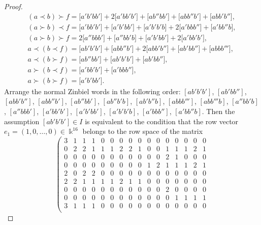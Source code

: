 \documentclass[pdftex]{sigma}
\numberwithin{equation}{section}
\begin{document}
\begin{proof}
\begin{gather*}
%
(a\prec b)\succ f
 = \bigl[a'b'bb'\bigr]+2\bigl[a'bb'b'\bigr] + \bigl[ab''bb'\bigr]+\bigl[abb''b'\bigr]+\bigl[abb'b''\bigr], \\
%
(a\succ b)\prec f
 = \bigl[a'bb'b'\bigr]+\bigl[a'b'bb'\bigr]+\bigl[a'b'b'b\bigr] + 2\bigl[a'bbb''\bigr]+\bigl[a'bb''b\bigr], \\
%
(a\succ b)\succ f
 = 2\bigl[a''bbb'\bigr]+\bigl[a''bb'b\bigr]+\bigl[a'b'bb'\bigr]+2\bigl[a'bb'b'\bigr], \\
%
a\prec (b\prec f)
 = \bigl[ab'b'b'\bigr]+\bigl[abb''b'\bigr] +2\bigl[abb'b''\bigr] +\bigl[ab'bb''\bigr] + \bigl[abbb'''\bigr], \\
%
a\prec (b\succ f)
 = \bigl[ab''bb'\bigr]+\bigl[ab'b'b'\bigr]+\bigl[ab'bb''\bigr], \\
%
a\succ (b\prec f)
 = \bigl[a'bb'b'\bigr] + \bigl[a'bbb''\bigr], \\
%
a\succ (b\succ f)
 = \bigl[a'b'bb'\bigr].
\end{gather*}
Arrange the normal Zinbiel words in the following order:
$[ab'b'b']$, $[ab'bb'']$, $[abb'b'']$, $[abb''b']$, $[ab''bb']$, $[ab''b'b]$, $[ab'b''b]$, $[abbb''']$, $[abb'''b]$, $[a''bb'b]$, $[a''bbb']$, $[a'bb'b']$, $[a'b'bb']$, $[a'b'b'b]$, $[a'bbb'']$, $[a'bb''b]$.
Then the assumption $[ab'b'b']\in I$ is equivalent to the condition
that the row vector $e_1 = (1,0,\dots ,0)\in \Bbbk ^{16}$
belongs to the row space of the matrix
%
\[ \left(
\begin{array}{cccccccccccccccc}
3& 1& 1& 1& 0& 0& 0& 0& 0& 0& 0& 0& 0& 0& 0& 0\\
0& 2& 2& 1& 1& 1& 2& 2& 1& 0& 0& 1& 1& 1& 2& 1\\
0& 0& 0& 0& 0& 0& 0& 0& 0& 0& 0& 2& 1& 0& 0& 0\\
0& 0& 0& 0& 0& 0& 0& 0& 0& 1& 2& 1& 1& 1& 2& 1\\
2& 0& 2& 2& 0& 0& 0& 0& 0& 0& 0& 0& 0& 0& 0& 0\\
2& 2& 1& 1& 1& 1& 2& 1& 1& 0& 0& 0& 0& 0& 0& 0\\
0& 0& 0& 0& 0& 0& 0& 0& 0& 0& 0& 2& 0& 0& 0& 0\\
0& 0& 0& 0& 0& 0& 0& 0& 0& 0& 0& 0& 1& 1& 1& 1\\
3& 1& 1& 1& 0& 0& 0& 0& 0& 0& 0& 0& 0& 0& 0& 0\\

\end{array}\]
\end{proof}
\end{document}
